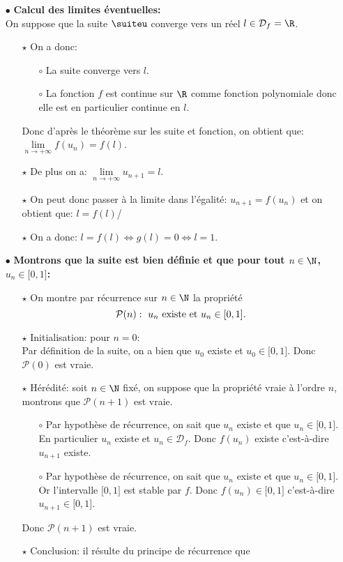 \begin{correction}
\begin{enumerate}
\begin{itemize}
\item[$\bullet$]  \textbf{Calcul des limites \'eventuelles:}\\
\noindent On suppose que la suite $\suiteu$ converge vers un r\'eel $l\in\mathcal{D}_f=\R$.
\begin{itemize}
\item[$\star$] On a donc:
\begin{itemize}
\item[$\circ$] La suite converge vers $l$.
\item[$\circ$] La fonction $f$ est continue sur $\R$ comme fonction polynomiale donc elle est en particulier continue en $l$.
\end{itemize}
Donc d'apr\`{e}s le th\'eor\`{e}me sur les suite et fonction, on obtient que: $\lim\limits_{n\to +\infty} f(u_n)=f(l)$.
\item[$\star$] De plus on a: $\lim\limits_{n\to +\infty} u_{n+1}=l$.
\item[$\star$] On peut donc passer \`{a} la limite dans l'\'egalit\'e: $u_{n+1}=f(u_n)$ et on obtient que: $l=f(l)$/
\item[$\star$] On a donc: $l=f(l)\Leftrightarrow g(l)=0\Leftrightarrow l=1$. \\
\noindent {}
\end{itemize}
\item[$\bullet$]  \textbf{Montrons que la suite est bien d\'efinie et que pour tout $n\in\N$, $u_n\in \lbrack 0,1\rbrack$:}
\begin{itemize}
\item[$\star$] On montre par r\'ecurrence sur $n\in\N$ la propri\'et\'e
$$\mathcal{P}(n):\ u_n\ \hbox{existe et}\ u_n\in\lbrack 0,1\rbrack.$$
\item[$\star$] Initialisation: pour $n=0$:\\
\noindent Par d\'efinition de la suite, on a bien que $u_0$ existe et $u_0\in\lbrack 0,1\rbrack$. Donc $\mathcal{P}(0)$ est vraie.
\item[$\star$] H\'er\'edit\'e: soit $n\in\N$ fix\'e, on suppose que la propri\'et\'e vraie \`{a} l'ordre $n$, montrons que $\mathcal{P}(n+1)$ est vraie.
\begin{itemize}
\item[$\circ$] Par hypoth\`{e}se de r\'ecurrence, on sait que $u_n$ existe et que $u_n\in\lbrack 0,1\rbrack$. En particulier $u_n$ existe et $u_n\in\mathcal{D}_f$. Donc $f(u_n)$ existe c'est-\`{a}-dire $u_{n+1}$ existe.
\item[$\circ$] Par hypoth\`{e}se de r\'ecurrence, on sait que $u_n$ existe et que $u_n\in\lbrack 0,1\rbrack$. Or l'intervalle $\lbrack 0,1\rbrack$ est stable par $f$. Donc $f(u_n)\in\lbrack 0,1\rbrack$ c'est-\`{a}-dire $u_{n+1}\in\lbrack 0,1\rbrack$.
\end{itemize}
Donc $\mathcal{P}(n+1)$ est vraie.
\item[$\star$] Conclusion: il r\'esulte du principe de r\'ecurrence que


\end{itemize}
\end{itemize}
\end{enumerate}
\end{correction}
